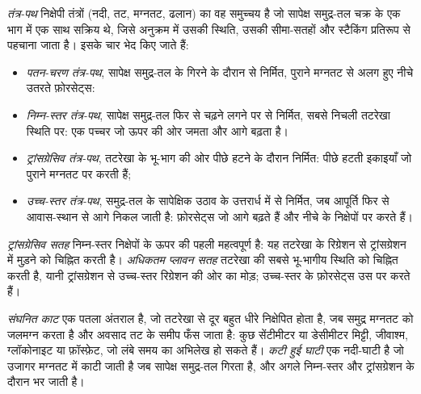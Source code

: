 \begin{definition}[तंत्र-पथ]\label{def:b3:sequence-stratigraphy:tract}
\emph{तंत्र-पथ} निक्षेपी तंत्रों (नदी, तट, मग्नतट, ढलान) का वह समुच्चय है
जो सापेक्ष समुद्र-तल चक्र के एक भाग में एक साथ सक्रिय थे,
जिसे अनुक्रम में उसकी स्थिति,
उसकी सीमा-सतहों और स्टैकिंग प्रतिरूप से पहचाना जाता है।
इसके चार भेद किए जाते हैं:
\begin{itemize}
\item \emph{पतन-चरण तंत्र-पथ},
  सापेक्ष समुद्र-तल के गिरने के दौरान  से निर्मित,
  पुराने मग्नतट से अलग हुए नीचे उतरते फ़ोरसेट्स:
\item \emph{निम्न-स्तर तंत्र-पथ},
  सापेक्ष समुद्र-तल फिर से चढ़ने लगने पर  से निर्मित,
  सबसे निचली तटरेखा स्थिति पर: एक पच्चर जो ऊपर की ओर जमता और आगे बढ़ता है।
\item \emph{ट्रांसग्रेसिव तंत्र-पथ},
  तटरेखा के भू-भाग की ओर पीछे हटने के दौरान निर्मित: पीछे हटती इकाइयाँ
  जो पुराने मग्नतट पर  करती हैं;
\item \emph{उच्च-स्तर तंत्र-पथ},
  समुद्र-तल के सापेक्षिक उठाव के उत्तरार्ध में  से निर्मित, जब आपूर्ति फिर से
  आवास-स्थान से आगे निकल जाती है: फ़ोरसेट्स जो आगे बढ़ते हैं और नीचे के निक्षेपों पर  करते हैं।
\end{itemize}
\end{definition}

\begin{definition}\label{def:b3:sequence-stratigraphy:surfaces}
\emph{ट्रांसग्रेसिव सतह} निम्न-स्तर निक्षेपों के ऊपर की पहली
महत्वपूर्ण  है: यह तटरेखा के रिग्रेशन से ट्रांसग्रेशन में मुड़ने को चिह्नित करती है।
\emph{अधिकतम प्लावन
सतह} तटरेखा की सबसे भू-भागीय स्थिति को चिह्नित करती है,
यानी ट्रांसग्रेशन से उच्च-स्तर रिग्रेशन की ओर का मोड़; उच्च-स्तर
के फ़ोरसेट्स उस पर  करते हैं।
\end{definition}

\begin{definition}[संघनित काट और कटी हुई घाटी]\label{def:b3:sequence-stratigraphy:condensed}
\emph{संघनित काट} एक पतला अंतराल है, जो तटरेखा से दूर बहुत धीरे
निक्षेपित होता है, जब समुद्र मग्नतट को जलमग्न करता है और अवसाद तट के समीप
फँस जाता है: कुछ सेंटीमीटर या डेसीमीटर
मिट्टी, जीवाश्म, ग्लॉकोनाइट या फ़ॉस्फ़ेट, जो लंबे समय का अभिलेख हो सकते हैं।
\emph{कटी हुई घाटी} एक नदी-घाटी है जो उजागर मग्नतट में
काटी जाती है जब सापेक्ष समुद्र-तल गिरता है, और अगले
निम्न-स्तर और ट्रांसग्रेशन के दौरान भर जाती है।
\end{definition}

